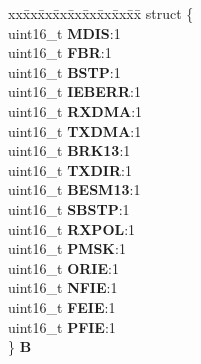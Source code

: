 \begin{DoxyCompactItemize}
\begin{tabbing}
\end{tabbing}\item 
\mbox{\label{unionESCI__tag_1_1ESCI__CR2__tag_ab993017bec962fa1ff4dd411304dd95c}} 
\begin{tabbing}
xx\=xx\=xx\=xx\=xx\=xx\=xx\=xx\=xx\=\kill
struct \{\\
\>uint16\_t {\bfseries MDIS}:1\\
\>uint16\_t {\bfseries FBR}:1\\
\>uint16\_t {\bfseries BSTP}:1\\
\>uint16\_t {\bfseries IEBERR}:1\\
\>uint16\_t {\bfseries RXDMA}:1\\
\>uint16\_t {\bfseries TXDMA}:1\\
\>uint16\_t {\bfseries BRK13}:1\\
\>uint16\_t {\bfseries TXDIR}:1\\
\>uint16\_t {\bfseries BESM13}:1\\
\>uint16\_t {\bfseries SBSTP}:1\\
\>uint16\_t {\bfseries RXPOL}:1\\
\>uint16\_t {\bfseries PMSK}:1\\
\>uint16\_t {\bfseries ORIE}:1\\
\>uint16\_t {\bfseries NFIE}:1\\
\>uint16\_t {\bfseries FEIE}:1\\
\>uint16\_t {\bfseries PFIE}:1\\
\} {\bfseries B}\\


\end{tabbing}
\end{DoxyCompactItemize}
